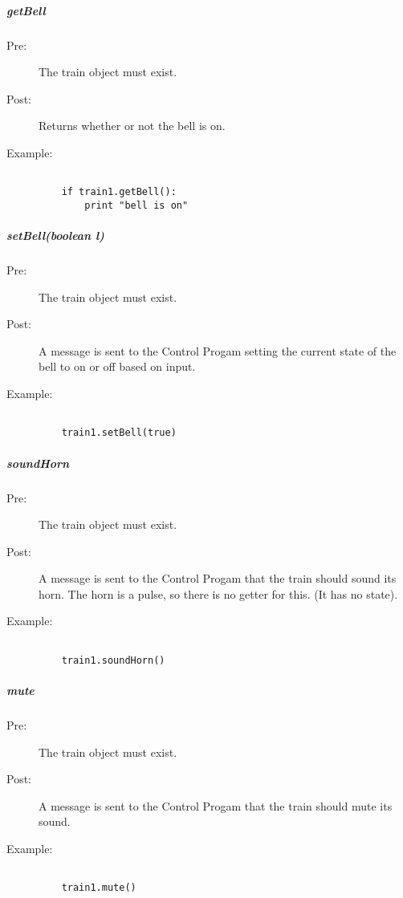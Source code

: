 \documentclass[a4paper,11pt,notitlepage]{article}
\def\CS{Control Progam\xspace}
\begin{document}
\subparagraph{getBell}
\begin{description}
\item[\hspace{1cm}Pre:] The train object must exist.
\item[\hspace{1cm}Post:] Returns whether or not the bell is on.
\item[\hspace{1cm}Example:]
\begin{verbatim}

    if train1.getBell():
        print "bell is on"
\end{verbatim}
\end{description}

\subparagraph{setBell(boolean l)}
\begin{description}
\item[\hspace{1cm}Pre:] The train object must exist.
\item[\hspace{1cm}Post:] A message is sent to the \CS setting the current state of the bell to on or off based on input.
\item[\hspace{1cm}Example:]
\begin{verbatim}

    train1.setBell(true)
\end{verbatim}
\end{description}

\subparagraph{soundHorn}
\begin{description}
\item[\hspace{1cm}Pre:] The train object must exist.
\item[\hspace{1cm}Post:] A message is sent to the \CS that the train should sound its horn. The horn is a pulse, so there is no getter for this. (It has no state).
\item[\hspace{1cm}Example:]
\begin{verbatim}

    train1.soundHorn()
\end{verbatim}
\end{description}

\subparagraph{mute}
\begin{description}
\item[\hspace{1cm}Pre:] The train object must exist.
\item[\hspace{1cm}Post:] A message is sent to the \CS that the train should mute its sound.
\item[\hspace{1cm}Example:]
\begin{verbatim}

    train1.mute()
\end{verbatim}
\end{description}
\end{document}
